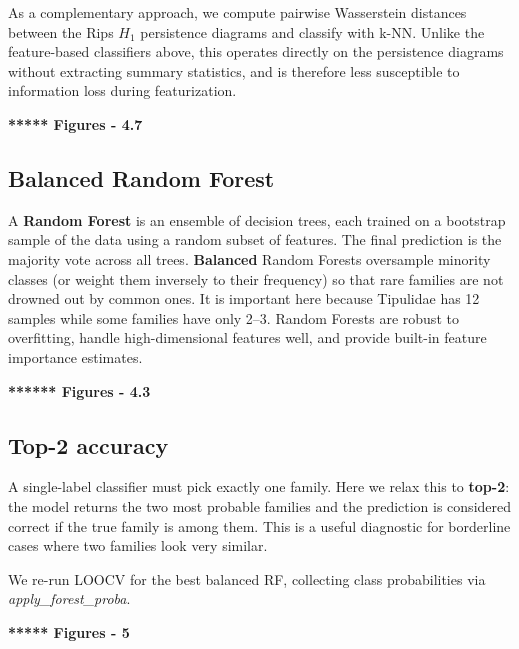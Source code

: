 \documentclass{birkjour}
\theoremstyle{definition}
\theoremstyle{remark}
\numberwithin{equation}{section}
\begin{document}
As a complementary approach, we compute pairwise Wasserstein distances between the Rips \(H_1\) persistence diagrams and classify with k-NN. 
Unlike the feature-based classifiers above, this operates directly on the persistence diagrams without extracting summary statistics, and is therefore less susceptible to information loss during featurization.

\textbf{***** Figures - 4.7}





\subsection{Balanced Random Forest}\quad

A \textbf{Random Forest} is an ensemble of decision trees, each trained on a bootstrap sample of the data using a random subset of features. 
The final prediction is the majority vote across all trees. \textbf{Balanced} Random Forests oversample minority classes (or weight them inversely to their frequency) so that rare families are not drowned out by common ones. It is important here because Tipulidae has 12 samples while some families have only 2–3. 
Random Forests are robust to overfitting, handle high-dimensional features well, and provide built-in feature importance estimates.

\textbf{****** Figures - 4.3}




\subsection{Top-2 accuracy}\quad 

A single-label classifier must pick exactly one family. Here we relax this to \textbf{top-2}: the model returns the two most probable families and the prediction is considered correct if the true family is among them. This is a useful diagnostic for borderline cases where two families look very similar.

We re-run LOOCV for the best balanced RF, collecting class probabilities via \emph{apply\_forest\_proba}.

\textbf{***** Figures - 5}












\end{document}
